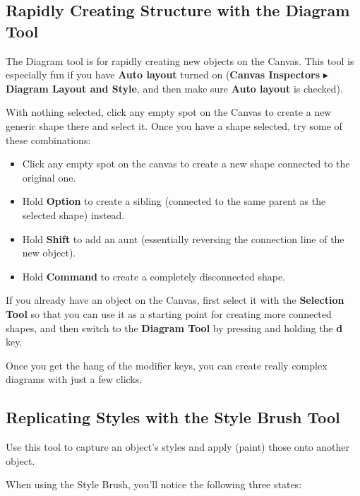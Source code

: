 \documentclass[../main.tex]{subfiles}
\begin{document}
\subsection{ Rapidly Creating Structure with the
Diagram Tool}

The Diagram tool is for rapidly creating new objects on the Canvas. This tool is especially fun
if you have \textbf{Auto layout} turned on (\textbf{Canvas Inspectors} $\blacktriangleright$
\textbf{Diagram Layout and Style}, and then make sure \textbf{Auto layout} is checked).

With nothing selected, click any empty spot on the Canvas to create a new generic shape there
and select it. Once you have a shape selected, try some of these combinations:

\begin{itemize}
  \item Click any empty spot on the canvas to create a new shape connected to the original one.
  \item Hold \textbf{Option} to create a sibling (connected to the same parent as the selected
    shape) instead.
  \item Hold \textbf{Shift} to add an aunt (essentially reversing the connection line of the new
    object).
  \item Hold \textbf{Command} to create a completely disconnected shape.
\end{itemize}


If you already have an object on the Canvas, first select it with the \textbf{Selection Tool} so
that you can use it as a starting point for creating more connected shapes, and then switch to
the \textbf{Diagram Tool} by pressing and holding the \textbf{d} key.

Once you get the hang of the modifier keys, you can create really complex diagrams with just a
few clicks.

\subsection{ Replicating Styles with the Style Brush
Tool}

Use this tool to capture an object's styles and apply (paint) those onto another object.

When using the Style Brush, you'll notice the following three states:
\end{document}
